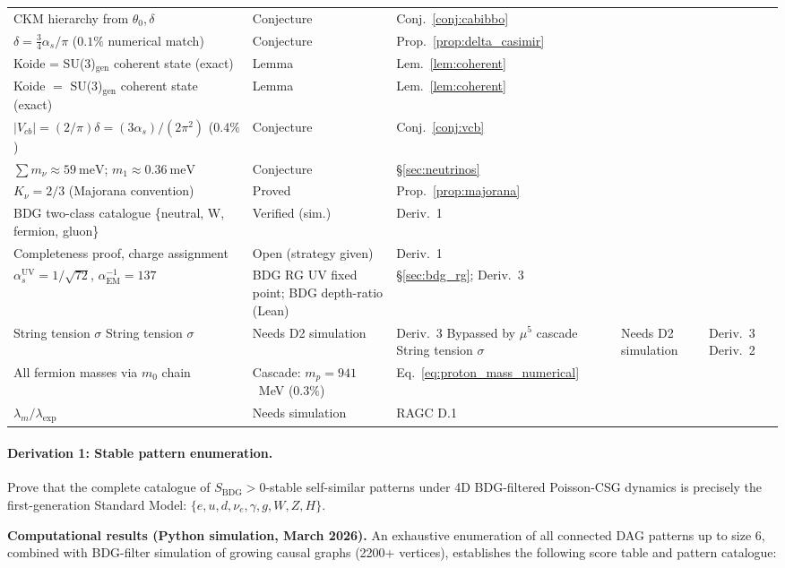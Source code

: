 \documentclass[11pt,a4paper]{article}
\newcommand{\SBDG}{S_{\mathrm{BDG}}}
\begin{document}
\begin{center}
\begin{tabular}{p{5.5cm}ll}
CKM hierarchy from $\theta_0, \delta$ & Conjecture & Conj.~\ref{conj:cabibbo} \\
$\delta = \tfrac{3}{4}\alpha_s/\pi$ ($0.1\%$ numerical match) & Conjecture & Prop.~\ref{prop:delta_casimir} \\
Koide = SU(3)$_\text{gen}$ coherent state (exact) & Lemma & Lem.~\ref{lem:coherent} \\
Koide $=$ SU(3)$_{\mathrm{gen}}$ coherent state (exact) & Lemma & Lem.~\ref{lem:coherent} \\
$|V_{cb}| = (2/\pi)\delta = (3\alpha_s)/(2\pi^2)$ ($0.4\%$) & Conjecture & Conj.~\ref{conj:vcb} \\
$\sum m_\nu \approx 59~\mathrm{meV}$; $m_1 \approx 0.36~\mathrm{meV}$ & Conjecture & \S\ref{sec:neutrinos} \\
$K_\nu = 2/3$ (Majorana convention) & Proved & Prop.~\ref{prop:majorana} \\
\midrule
BDG two-class catalogue \{neutral, W, fermion, gluon\} & Verified (sim.) & Deriv.~1 \\
Completeness proof, charge assignment & Open (strategy given) & Deriv.~1 \\
$\alpha_s^{\mathrm{UV}} = 1/\sqrt{72}$, $\alpha^{-1}_{\mathrm{EM}} = 137$ & BDG RG UV fixed point; BDG depth-ratio (Lean) & \S\ref{sec:bdg_rg}; Deriv.~3 \\
String tension $\sigma$ String tension $\sigma$ & Needs D2 simulation & Deriv.~3 Bypassed by $\mu^5$ cascade String tension $\sigma$ & Needs D2 simulation & Deriv.~3 Deriv.~2 \\
All fermion masses via $m_0$ chain & Cascade: $m_p = 941$~MeV ($0.3\%$) & Eq.~\eqref{eq:proton_mass_numerical} \\
$\lambda_m/\lambda_{\mathrm{exp}}$ & Needs simulation & RAGC D.1 \\
\bottomrule
\end{tabular}
\end{center}

\paragraph{Derivation 1: Stable pattern enumeration.}
Prove that the complete catalogue of $\SBDG > 0$-stable self-similar patterns
under 4D BDG-filtered Poisson-CSG dynamics is precisely the first-generation
Standard Model: $\{e, u, d, \nu_e, \gamma, g, W, Z, H\}$.

\textbf{Computational results (Python simulation, March 2026).}
An exhaustive enumeration of all connected DAG patterns up to size 6, combined
with BDG-filter simulation of growing causal graphs (2200+ vertices), establishes
the following score table and pattern catalogue:
\end{document}
